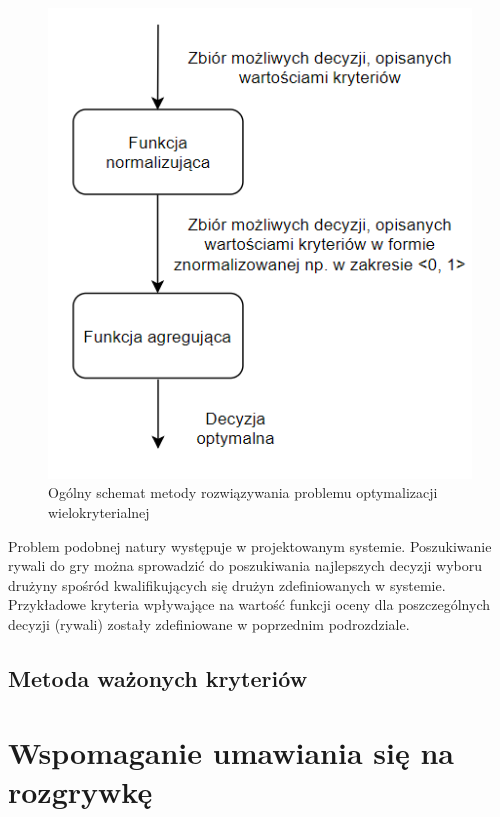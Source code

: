 \begin{figure}[ht]
\centering
\includegraphics[width=0.5\linewidth]{03-koncept/rys/tradycyjne-algorytmy-opt.PNG}
\caption{Ogólny schemat metody rozwiązywania problemu optymalizacji wielokryterialnej}
\label{fig:diagram-trad-alg-opt}
\end{figure}

Problem podobnej natury występuje w projektowanym systemie. Poszukiwanie rywali do gry można sprowadzić do poszukiwania najlepszych decyzji wyboru drużyny spośród kwalifikujących się drużyn zdefiniowanych w systemie. Przykładowe kryteria wpływające na wartość funkcji oceny dla poszczególnych decyzji (rywali) zostały zdefiniowane w poprzednim podrozdziale.


\subsection{Metoda ważonych kryteriów}

\section{Wspomaganie umawiania się na rozgrywkę}

